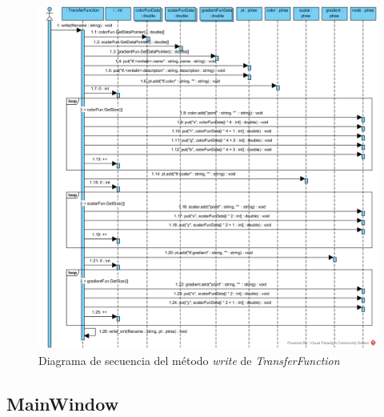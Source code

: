 \begin{figure}[H]
	\centering
	\includegraphics[width=12cm]{imagenes/diagramas/secuencia/TransferFunction_Write}
	\caption{Diagrama de secuencia del método \textit{write} de \textit{TransferFunction}}
	\label{fig:diagrama_secuencia_transferfunction_write}
\end{figure}

\subsection{MainWindow}

